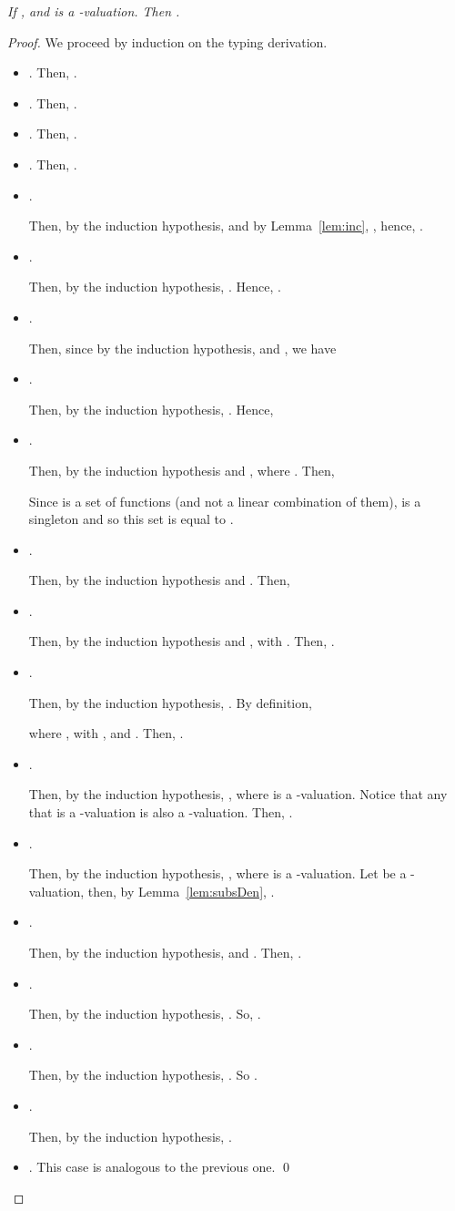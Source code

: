\documentclass[preprint]{elsarticle}
\newcommand\recap[3]{\noindent {\bf #1 \ref{#2}.} \emph{#3}}
\begin{document}
\recap{Theorem}{thm:soundness}{
  If , and  is a -valuation. Then .
}
\begin{proof}
  We proceed by induction on the typing derivation.
  \begin{itemize}
  \item .
    Then, .
  \item .
    Then, .
  \item .
    Then, .
  \item .
    Then, .
  \item .

    Then, by the induction hypothesis,  and by
    Lemma~\ref{lem:inc}, , hence, .
  \item .

    Then, by the induction hypothesis, .
    Hence, .
  \item .

    Then, since by the induction hypothesis,  and , we have
    
  \item .

    Then, by the induction hypothesis, . Hence,
    
  \item .

    Then, by the induction hypothesis  and , where .
    Then,
    

    Since  is a set of functions (and not a linear
    combination of them),  is a singleton and so this set is equal to
    .
  \item .

    Then, by the induction hypothesis  and . Then,

    
  \item .

    Then, by the induction hypothesis  and
    , with .
    Then,
    .
  \item .

    Then, by the induction hypothesis, . By definition,
    
    where , with
    , and . Then,
    .
  \item .

    Then, by the induction hypothesis, , where
     is a -valuation. Notice that any  that is a
    -valuation is also a -valuation. Then, .
  \item .

    Then, by the induction hypothesis, , where
     is a -valuation. Let  be a
    -valuation, then, by Lemma~\ref{lem:subsDen},
    .
  \item .


    Then, by the induction hypothesis,  and
    . Then,
    .
  \item .

    Then, by the induction hypothesis, . So,
    .
  \item .

    Then, by the induction
    hypothesis, . So
    .
  \item .

    Then, by the induction hypothesis, .
  \item .
    This case is analogous to the previous one.
    \qed
  \end{itemize}
\end{proof}
\end{document}
